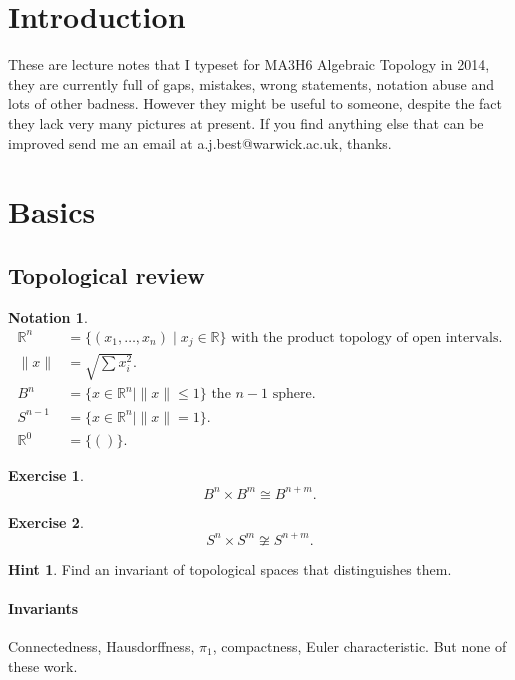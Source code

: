\documentclass[12pt]{article}
\theoremstyle{definition}
\theoremstyle{definition}
\newtheorem*{exer}{Exercise}
\newtheorem*{nota}{Notation}
\newtheorem*{hint}{Hint}
\newcommand{\RR}{\mathbb{R}}
\begin{document}
\maketitle
\tableofcontents

\section{Introduction}
These are lecture notes that I typeset for MA3H6 Algebraic Topology in 2014, they are currently full of gaps, mistakes, wrong statements, notation abuse and lots of other badness.
However they might be useful to someone, despite the fact they lack very many pictures at present.
If you find anything else that can be improved send me an email at a.j.best@warwick.ac.uk, thanks.

\section{Basics}
\subsection{Topological review}

\begin{nota}
\begin{align*}
\RR^n &= \{(x_1, \ldots,x_n)\mid x_j\in\RR\}\text{ with the product topology of open intervals}.\\
\|x\| &= \sqrt{\sum x_i^2}.\\
B^n &= \{x\in \RR^n \mid \|x\| \le 1\}\text{ the }n-1\text{ sphere}.\\
S^{n-1} &= \{x\in\RR^n\mid\|x\| = 1\}.\\
\RR^0 &= \{()\}.
\end{align*}
\end{nota}


\begin{exer}
\[B^n \times B^m \cong B^{n+m}.\]
\end{exer}

\begin{exer}
\[S^n \times S^m\not\cong S^{n+m}.\]
\end{exer}

\begin{hint}
Find an invariant of topological spaces that distinguishes them.
\end{hint}

\paragraph{Invariants}
Connectedness, Hausdorffness, $\pi_1$, compactness, Euler characteristic.
But none of these work.
\end{document}
